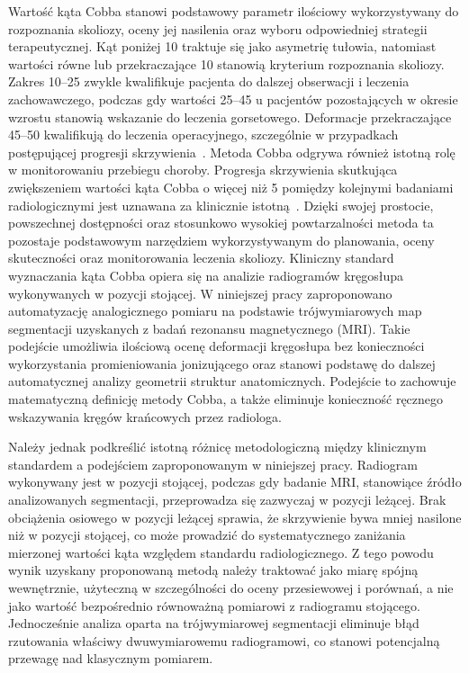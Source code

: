 Wartość kąta Cobba stanowi podstawowy parametr ilościowy wykorzystywany do rozpoznania skoliozy, oceny jej nasilenia oraz wyboru odpowiedniej strategii terapeutycznej.
Kąt poniżej 10\degree{} traktuje się jako asymetrię tułowia, natomiast wartości równe lub przekraczające 10\degree{} stanowią kryterium rozpoznania skoliozy.
Zakres 10--25\degree{} zwykle kwalifikuje pacjenta do dalszej obserwacji i leczenia zachowawczego, podczas gdy wartości 25--45\degree{}  u pacjentów pozostających w okresie wzrostu stanowią wskazanie do leczenia gorsetowego.
Deformacje przekraczające 45--50\degree{} kwalifikują do leczenia operacyjnego, szczególnie w przypadkach postępującej progresji skrzywienia~\cite{negrini_sosort, kuznia}.
Metoda Cobba odgrywa również istotną rolę w monitorowaniu przebiegu choroby. Progresja skrzywienia skutkująca zwiększeniem wartości kąta Cobba o więcej niż 5\degree{} pomiędzy kolejnymi badaniami radiologicznymi jest uznawana za klinicznie istotną~\cite{kuznia}. Dzięki swojej prostocie, powszechnej dostępności oraz stosunkowo wysokiej powtarzalności metoda ta pozostaje podstawowym narzędziem wykorzystywanym do planowania, oceny skuteczności oraz monitorowania leczenia skoliozy.
Kliniczny standard wyznaczania kąta Cobba opiera się na analizie radiogramów kręgosłupa wykonywanych w pozycji stojącej. W niniejszej pracy zaproponowano automatyzację analogicznego pomiaru na podstawie trójwymiarowych map segmentacji uzyskanych z badań rezonansu magnetycznego (MRI). Takie podejście umożliwia ilościową ocenę deformacji kręgosłupa bez konieczności wykorzystania promieniowania jonizującego oraz stanowi podstawę do dalszej automatycznej analizy geometrii struktur anatomicznych.
Podejście to zachowuje matematyczną definicję metody Cobba, a także eliminuje konieczność ręcznego wskazywania kręgów krańcowych przez radiologa.

Należy jednak podkreślić istotną różnicę metodologiczną między klinicznym standardem a podejściem zaproponowanym w niniejszej pracy.
Radiogram wykonywany jest w pozycji stojącej, podczas gdy badanie MRI, stanowiące źródło analizowanych segmentacji, przeprowadza się zazwyczaj w pozycji leżącej.
Brak obciążenia osiowego w pozycji leżącej sprawia, że skrzywienie bywa mniej nasilone niż w pozycji stojącej, co może prowadzić do systematycznego zaniżania mierzonej wartości kąta względem standardu radiologicznego.
Z tego powodu wynik uzyskany proponowaną metodą należy traktować jako miarę spójną wewnętrznie, użyteczną w szczególności do oceny przesiewowej i porównań, a nie jako wartość bezpośrednio równoważną pomiarowi z radiogramu stojącego.
Jednocześnie analiza oparta na trójwymiarowej segmentacji eliminuje błąd rzutowania właściwy dwuwymiarowemu radiogramowi, co stanowi potencjalną przewagę nad klasycznym pomiarem.

